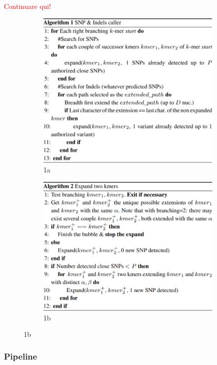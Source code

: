 \documentclass[../main.tex]{subfiles}
\begin{document}
\textcolor{red}{Continuare qui!}

\begin{figure}[ht]
\begin{subfigure}{.5\textwidth}
  \centering
  \includegraphics[width=.8\linewidth]{../images/discosnp_alg1}
  \caption{1a}
  \label{fig:sfig1}
\end{subfigure}
\begin{subfigure}{.5\textwidth}
  \centering
  \includegraphics[width=.8\linewidth]{../images/discosnp_alg2}
  \caption{1b}
  \label{fig:sfig2}
\end{subfigure}
\end{figure}

\subsubsection{Pipeline}
\end{document}
